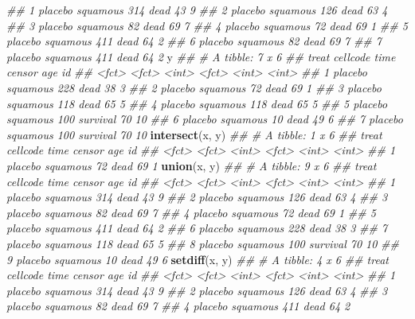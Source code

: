 \documentclass[
]{book}
\newenvironment{Shaded}{\begin{snugshade}}{\end{snugshade}}
\newcommand{\CommentTok}[1]{\textcolor[rgb]{0.56,0.35,0.01}{\textit{#1}}}
\newcommand{\KeywordTok}[1]{\textcolor[rgb]{0.13,0.29,0.53}{\textbf{#1}}}
\newcommand{\NormalTok}[1]{#1}
\begin{document}
\begin{Shaded}
\begin{Highlighting}[]
\CommentTok{\#\# 1 placebo squamous   314 dead      43     9}
\CommentTok{\#\# 2 placebo squamous   126 dead      63     4}
\CommentTok{\#\# 3 placebo squamous    82 dead      69     7}
\CommentTok{\#\# 4 placebo squamous    72 dead      69     1}
\CommentTok{\#\# 5 placebo squamous   411 dead      64     2}
\CommentTok{\#\# 6 placebo squamous    82 dead      69     7}
\CommentTok{\#\# 7 placebo squamous   411 dead      64     2}
\NormalTok{y}
\CommentTok{\#\# \# A tibble: 7 x 6}
\CommentTok{\#\#   treat   cellcode  time censor     age    id}
\CommentTok{\#\#   \textless{}fct\textgreater{}   \textless{}fct\textgreater{}    \textless{}int\textgreater{} \textless{}fct\textgreater{}    \textless{}int\textgreater{} \textless{}int\textgreater{}}
\CommentTok{\#\# 1 placebo squamous   228 dead        38     3}
\CommentTok{\#\# 2 placebo squamous    72 dead        69     1}
\CommentTok{\#\# 3 placebo squamous   118 dead        65     5}
\CommentTok{\#\# 4 placebo squamous   118 dead        65     5}
\CommentTok{\#\# 5 placebo squamous   100 survival    70    10}
\CommentTok{\#\# 6 placebo squamous    10 dead        49     6}
\CommentTok{\#\# 7 placebo squamous   100 survival    70    10}
\KeywordTok{intersect}\NormalTok{(x, y)}
\CommentTok{\#\# \# A tibble: 1 x 6}
\CommentTok{\#\#   treat   cellcode  time censor   age    id}
\CommentTok{\#\#   \textless{}fct\textgreater{}   \textless{}fct\textgreater{}    \textless{}int\textgreater{} \textless{}fct\textgreater{}  \textless{}int\textgreater{} \textless{}int\textgreater{}}
\CommentTok{\#\# 1 placebo squamous    72 dead      69     1}
\KeywordTok{union}\NormalTok{(x, y)}
\CommentTok{\#\# \# A tibble: 9 x 6}
\CommentTok{\#\#   treat   cellcode  time censor     age    id}
\CommentTok{\#\#   \textless{}fct\textgreater{}   \textless{}fct\textgreater{}    \textless{}int\textgreater{} \textless{}fct\textgreater{}    \textless{}int\textgreater{} \textless{}int\textgreater{}}
\CommentTok{\#\# 1 placebo squamous   314 dead        43     9}
\CommentTok{\#\# 2 placebo squamous   126 dead        63     4}
\CommentTok{\#\# 3 placebo squamous    82 dead        69     7}
\CommentTok{\#\# 4 placebo squamous    72 dead        69     1}
\CommentTok{\#\# 5 placebo squamous   411 dead        64     2}
\CommentTok{\#\# 6 placebo squamous   228 dead        38     3}
\CommentTok{\#\# 7 placebo squamous   118 dead        65     5}
\CommentTok{\#\# 8 placebo squamous   100 survival    70    10}
\CommentTok{\#\# 9 placebo squamous    10 dead        49     6}
\KeywordTok{setdiff}\NormalTok{(x, y)}
\CommentTok{\#\# \# A tibble: 4 x 6}
\CommentTok{\#\#   treat   cellcode  time censor   age    id}
\CommentTok{\#\#   \textless{}fct\textgreater{}   \textless{}fct\textgreater{}    \textless{}int\textgreater{} \textless{}fct\textgreater{}  \textless{}int\textgreater{} \textless{}int\textgreater{}}
\CommentTok{\#\# 1 placebo squamous   314 dead      43     9}
\CommentTok{\#\# 2 placebo squamous   126 dead      63     4}
\CommentTok{\#\# 3 placebo squamous    82 dead      69     7}
\CommentTok{\#\# 4 placebo squamous   411 dead      64     2}
\end{Highlighting}
\end{Shaded}
\end{document}
